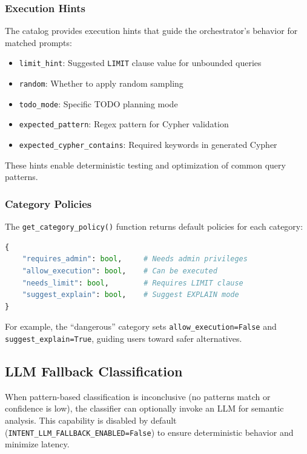 \subsubsection{Execution Hints}

The catalog provides execution hints that guide the orchestrator's behavior for matched prompts:

\begin{itemize}
    \item \texttt{limit\_hint}: Suggested \texttt{LIMIT} clause value for unbounded queries
    \item \texttt{random}: Whether to apply random sampling
    \item \texttt{todo\_mode}: Specific TODO planning mode
    \item \texttt{expected\_pattern}: Regex pattern for Cypher validation
    \item \texttt{expected\_cypher\_contains}: Required keywords in generated Cypher
\end{itemize}

These hints enable deterministic testing and optimization of common query patterns.

\subsubsection{Category Policies}

The \texttt{get\_category\_policy()} function returns default policies for each category:

\begin{lstlisting}[language=Python, caption={Category policy structure}, label=lst:category-policy]
{
    "requires_admin": bool,     # Needs admin privileges
    "allow_execution": bool,    # Can be executed
    "needs_limit": bool,        # Requires LIMIT clause
    "suggest_explain": bool,    # Suggest EXPLAIN mode
}
\end{lstlisting}

For example, the ``dangerous'' category sets \texttt{allow\_execution=False} and \texttt{suggest\_explain=True}, guiding users toward safer alternatives.

\subsection{LLM Fallback Classification}

When pattern-based classification is inconclusive (no patterns match or confidence is low), the classifier can optionally invoke an LLM for semantic analysis. This capability is disabled by default (\texttt{INTENT\_LLM\_FALLBACK\_ENABLED=False}) to ensure deterministic behavior and minimize latency.

